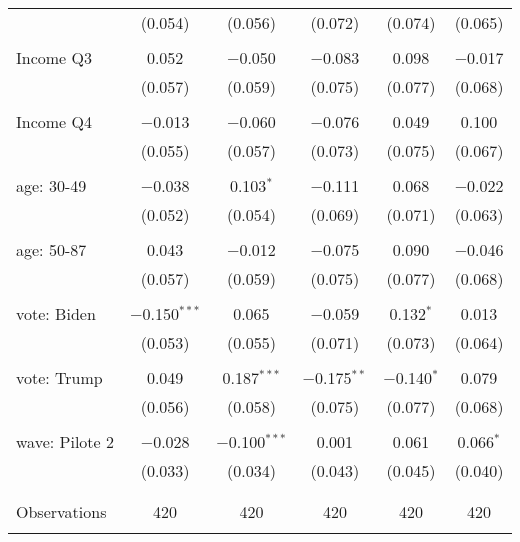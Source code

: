 \begin{tabular}{@{\extracolsep{5pt}}lccccc}
  & (0.054) & (0.056) & (0.072) & (0.074) & (0.065) \\ 
  & & & & & \\ 
 Income Q3 & 0.052 & $-$0.050 & $-$0.083 & 0.098 & $-$0.017 \\ 
  & (0.057) & (0.059) & (0.075) & (0.077) & (0.068) \\ 
  & & & & & \\ 
 Income Q4 & $-$0.013 & $-$0.060 & $-$0.076 & 0.049 & 0.100 \\ 
  & (0.055) & (0.057) & (0.073) & (0.075) & (0.067) \\ 
  & & & & & \\ 
 age: 30-49 & $-$0.038 & 0.103$^{*}$ & $-$0.111 & 0.068 & $-$0.022 \\ 
  & (0.052) & (0.054) & (0.069) & (0.071) & (0.063) \\ 
  & & & & & \\ 
 age: 50-87 & 0.043 & $-$0.012 & $-$0.075 & 0.090 & $-$0.046 \\ 
  & (0.057) & (0.059) & (0.075) & (0.077) & (0.068) \\ 
  & & & & & \\ 
 vote: Biden & $-$0.150$^{***}$ & 0.065 & $-$0.059 & 0.132$^{*}$ & 0.013 \\ 
  & (0.053) & (0.055) & (0.071) & (0.073) & (0.064) \\ 
  & & & & & \\ 
 vote: Trump & 0.049 & 0.187$^{***}$ & $-$0.175$^{**}$ & $-$0.140$^{*}$ & 0.079 \\ 
  & (0.056) & (0.058) & (0.075) & (0.077) & (0.068) \\ 
  & & & & & \\ 
 wave: Pilote 2 & $-$0.028 & $-$0.100$^{***}$ & 0.001 & 0.061 & 0.066$^{*}$ \\ 
  & (0.033) & (0.034) & (0.043) & (0.045) & (0.040) \\ 
  & & & & & \\ 
\hline \\[-1.8ex] 

Observations & 420 & 420 & 420 & 420 & 420 \\ 
\hline 
\hline \\[-1.8ex] 
\end{tabular} 